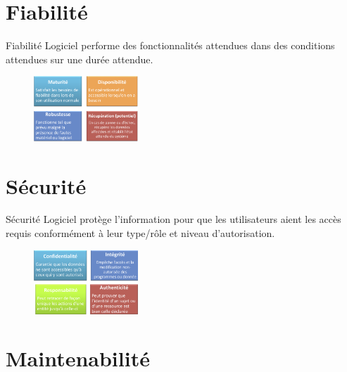 \documentclass[16pt]{report}
\begin{document}
\begin{multicols*}{2}
        \section{Fiabilité}
        
        \begin{Concept}{Fiabilité}{}
            Logiciel performe des fonctionnalités attendues dans des conditions attendues
            sur une durée attendue.        
    \end{Concept}

        \begin{figure}[H]
            \begin{center}
                \includegraphics[width=0.35\textwidth]{cap5.png}
            \end{center}
        \end{figure}


        \section{Sécurité}
        
        \begin{Concept}{Sécurité}{}
           Logiciel protège l’information pour que les utilisateurs aient les accès requis
            conformément à leur type/rôle et niveau d’autorisation.
        \end{Concept}
        
    
        \begin{figure}[H]
            \begin{center}
                \includegraphics[width=0.35\textwidth]{cap6.png}
            \end{center}
        \end{figure}



        \section{Maintenabilité}
        

\end{multicols*}
\end{document}
